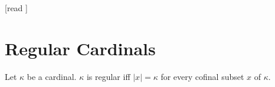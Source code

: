 \documentclass[10pt]{article}
\begin{document}
  \begin{imports}
    \begin{forthel}
      [read ]
    \end{forthel}
  \end{imports}


  \section*{Regular Cardinals}

  \begin{forthel}
    \begin{definition}[id=SET_THEORY_06_6532641205487950,printid]
      Let $\kappa$ be a cardinal.
      $\kappa$ is regular iff $|x| = \kappa$ for every cofinal subset $x$ of $\kappa$.
    \end{definition}
  \end{forthel}
\end{document}
